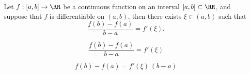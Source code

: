 

\begin{theorem}
Let $f:[a,b]\to\RR$ be a continuous function on an interval 
$[a,b]\subset\RR$, and suppose that $f$ is differentiable 
on $(a,b)$, then there exists $\xi\in (a,b)$ such that
$$
\frac{f(b)-f(a)}{b-a}=f'(\xi).
$$

\end{theorem}




$$
\frac{f(b)-f(a)}{b-a}=f'(\xi)
$$


$$
f(b)-f(a)=f'(\xi)\,(b-a)
$$